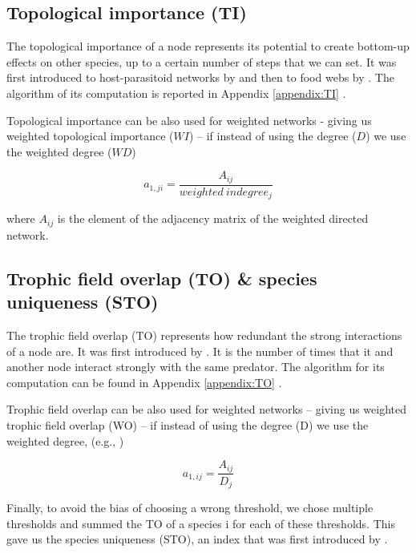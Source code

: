 \documentclass[twocolumn]{article}
\begin{document}
	\subsection*{Topological importance (TI)}

		The topological importance of a node represents its potential to create bottom-up effects on other species, up to a certain number of steps that we can set. It was first introduced to host-parasitoid networks by \citet{Muller1999} and then to food webs by \citet{Jordan2003}. The algorithm of its computation is reported in Appendix \ref{appendix:TI} \citep{Jordan2009}.



		Topological importance can be also used for weighted networks - giving us weighted topological importance ($WI$) – if instead of using the degree ($D$) we use the weighted degree ($WD$) \citep{Scotti2007}

						\begin{equation}
							a_{1,ji}=\frac{A_{ij}}{weighted\:indegree_j}
						\end{equation}

		\noindent where $A_{ij}$ is the element of the adjacency matrix of the weighted directed network.

	\subsection*{Trophic field overlap (TO) & species uniqueness (STO)}

		The trophic field overlap (TO) represents how redundant the strong interactions of a node are. It was first introduced by \citet{Jordan2009a}. It is the number of times that it and another node interact strongly with the same predator. The algorithm for its computation can be found in Appendix \ref{appendix:TO} \citep{Jordan2018}.


		Trophic field overlap can be also used for weighted networks – giving us weighted trophic field overlap (WO) – if instead of using the degree (D) we use the weighted degree, (e.g., \citet{Xiao2019})

						\begin{equation}
							a_{1,ij}=\frac{A_{ij}}{D_j}
						\end{equation}

		Finally, to avoid the bias of choosing a wrong threshold, we chose multiple thresholds and summed the TO of a species i for each of these thresholds. This gave us the species uniqueness (STO), an index that was first introduced by \citet{Lai2015}.
\end{document}
